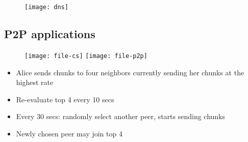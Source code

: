 \begin{figure}[H]
  \centering
  \texttt{[image: dns]}
\end{figure}


\subsection{P2P applications}

\begin{figure}[H]
  \centering
  \texttt{[image: file-cs]}
  \texttt{[image: file-p2p]}
\end{figure}

\begin{itemize}
  \item Alice sends chunks to four neighbors currently
    sending her chunks at the highest rate
  \item Re-evaluate top 4 every 10 secs
  \item  Every 30 secs: randomly select another peer, starts sending chunks
  \item Newly chosen peer may join top 4
\end{itemize}


